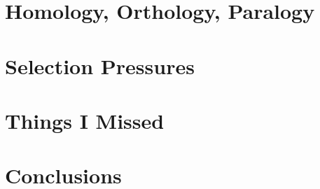 \section{Homology, Orthology, Paralogy}
%
%
%

\section{Selection Pressures}
%

\section{Things I Missed}
%

\section{Conclusions}
%


%




